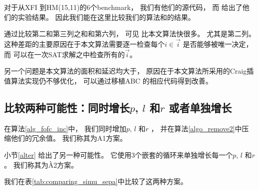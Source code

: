 对于从XFI 到HM(15,11)的6个benchmark，
我们有他们的源代码，
而 给出了他们的实验结果。
因此我们能在这里比较我们的算法和的结果。

通过比较第二和第三列之和和第六列，
可见 比本文算法快很多。
尤其是第二列。
这种差距的主要原因在于本文算法需要逐一检查每个$i\in \vec{i}$ 是否能够被唯一决定，
而 可以在一次SAT求解之中检查所有的$\vec{i}$。

另一个问题是本文算法的面积和延迟均大于，
原因在于本文算法所采用的Craig插值算法实现仍不够优化，
可以通过移植ABC 的相应代码得到改善。




\subsection{比较两种可能性：同时增长$p$, $l$ 和$r$ 或者单独增长}\label{subsec_incr_plr_exp}

在算法\ref{alg_fofc_inc}中，
我们同时增加$p$, $l$ 和$r$ ，
并在算法\ref{algo_remove2}中压缩他们的冗余值。
我们称其为A1方案。

小节\ref{alter} 给出了另一种可能性。
它使用3个嵌套的循环来单独增长每一个$p$, $l$ 和$r$ 。
我们称其为À2方案。

我们在表\ref{tab:comparing_simu_sepa}中比较了这两种方案。

